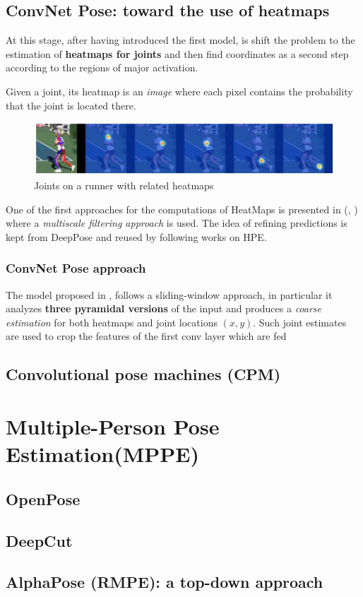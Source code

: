 \subsection{ConvNet Pose: toward the use of heatmaps}
At this stage, after having introduced the first model, is shift the problem to the estimation of \textbf{heatmaps for joints} and then find coordinates as a second step according to the regions of major activation.
\begin{definition}
    Given a joint, its heatmap is an \textit{image} where each pixel contains the probability that the joint is located there.
\end{definition}
\begin{figure}[h]
    \centering
    \includegraphics[scale=0.8]{img/HeatMap.png}
    \caption{Joints on a runner with related heatmaps}
\end{figure}

One of the first approaches for the computations of HeatMaps is presented in  (\citeauthor{ConvNetPose}, \cite{ConvNetPose}) where a \textit{multiscale filtering approach} is used. The idea of refining predictions is kept from DeepPose and reused by following works on HPE.\\
\subsubsection{ConvNet Pose approach}
The model proposed in \cite{ConvNetPose}, follows a sliding-window approach, in particular it analyzes \textbf{three pyramidal versions} of the input and produces a \textit{coarse estimation} for both heatmaps and joint locations $(x,y)$. Such joint estimates are used to crop the features of the first conv layer which are fed 

\subsection{Convolutional pose machines (CPM)}

\section{Multiple-Person Pose Estimation(MPPE)}

\subsection{OpenPose}

\subsection{DeepCut}

\subsection{AlphaPose (RMPE): a top-down approach}


